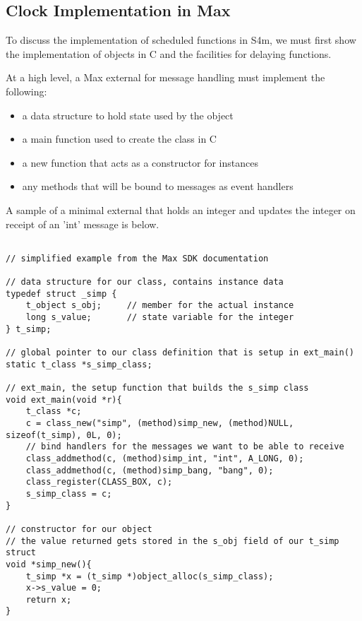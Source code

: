 \documentclass[acmsmall]{acmart}
\begin{document}
{%


\subsection{Clock Implementation in Max}

To discuss the implementation of scheduled functions in S4m, we must first show
the implementation of objects in C and the facilities for delaying functions.

At a high level, a Max external for message handling must implement the following:
\begin{itemize}
\item a data structure to hold state used by the object
\item a main function used to create the class in C
\item a new function that acts as a constructor for instances
\item any methods that will be bound to messages as event handlers
\end{itemize}

A sample of a minimal external that holds an integer and updates the integer
on receipt of an 'int' message is below.

\begin{verbatim}

// simplified example from the Max SDK documentation

// data structure for our class, contains instance data
typedef struct _simp {
    t_object s_obj;     // member for the actual instance 
    long s_value;       // state variable for the integer
} t_simp;

// global pointer to our class definition that is setup in ext_main()
static t_class *s_simp_class; 

// ext_main, the setup function that builds the s_simp class
void ext_main(void *r){
    t_class *c;
    c = class_new("simp", (method)simp_new, (method)NULL, sizeof(t_simp), 0L, 0);
    // bind handlers for the messages we want to be able to receive
    class_addmethod(c, (method)simp_int, "int", A_LONG, 0);
    class_addmethod(c, (method)simp_bang, "bang", 0);
    class_register(CLASS_BOX, c);
    s_simp_class = c;
}

// constructor for our object
// the value returned gets stored in the s_obj field of our t_simp struct
void *simp_new(){
    t_simp *x = (t_simp *)object_alloc(s_simp_class);
    x->s_value = 0;
    return x;
}


\end{verbatim}}
\end{document}
